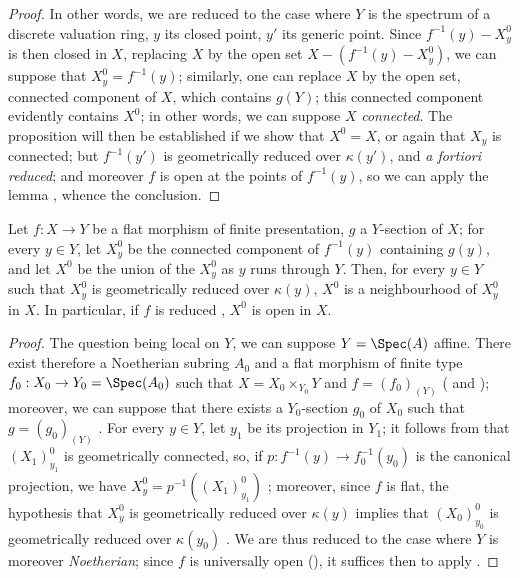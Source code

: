 \begin{proof}
In other words, we are reduced to the case where $Y$ is the spectrum of a discrete valuation ring, $y$ its closed point, $y'$ its generic point.
Since $f^{-1}(y)-X_y^0$ is then closed in $X$, replacing $X$ by the open set $X-(f^{-1}(y)-X_y^0)$, we can suppose that $X_y^0=f^{-1}(y)$; similarly, one can replace $X$ by the open set, connected component of $X$, which contains $g(Y)$; this connected component evidently contains $X^0$; in other words, we can suppose $X$ \emph{connected}.
The proposition will then be established if we show that $X^0=X$, or again that $X_y$ is connected; but $f^{-1}(y')$ is geometrically reduced over $\kappa(y')$, and \emph{a fortiori} \emph{reduced}; and moreover $f$ is open at the points of $f^{-1}(y)$, so we can apply the lemma , whence the conclusion.
\end{proof}

\begin{corollary}[15.6.5]
\label{IV.15.6.5}
Let $f:X\to Y$ be a flat morphism of finite presentation, $g$ a $Y$-section of $X$; for every $y\in Y$, let $X_y^0$ be the connected component of $f^{-1}(y)$ containing $g(y)$, and let $X^0$ be the union of the $X_y^0$ as $y$ runs through $Y$.
Then, for every $y\in Y$ such that $X_y^0$ is geometrically reduced over $\kappa(y)$, $X^0$ is a neighbourhood of $X_y^0$ in $X$.
In particular, if $f$ is reduced , $X^0$ is open in $X$.
\end{corollary}

\begin{proof}
The question being local on $Y$, we can suppose $Y=\Spec(A)$ affine.
There exist therefore a Noetherian subring $A_0$ and a flat morphism of finite type $f_0:X_0\to Y_0=\Spec(A_0)$ such that $X=X_0\times_{Y_0}Y$ and $f=(f_0)_{(Y)}$ ( and ); moreover, we can suppose that there exists a $Y_0$-section $g_0$ of $X_0$ such that $g=(g_0)_{(Y)}$ .
For every $y\in Y$, let $y_1$ be its projection in $Y_1$; it follows from  that $(X_1)_{y_1}^0$ is geometrically connected, so, if $p:f^{-1}(y)\to f_0^{-1}(y_0)$ is the canonical projection, we have $X_y^0=p^{-1}((X_1)_{y_1}^0)$ ; moreover, since $f$ is flat, the hypothesis that $X_y^0$ is geometrically reduced over $\kappa(y)$ implies that $(X_0)_{y_0}^0$ is geometrically reduced over $\kappa(y_0)$ .
We are thus reduced to the case where
$Y$ is moreover \emph{Noetherian}; since $f$ is universally open (), it suffices then to apply .
\end{proof}

